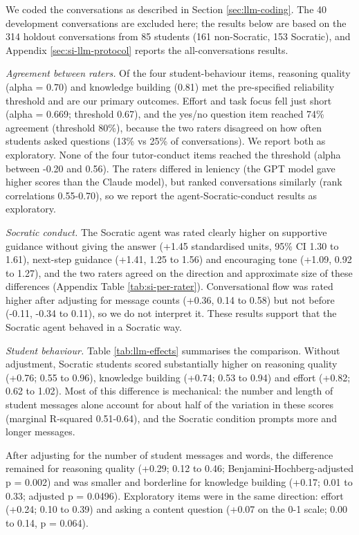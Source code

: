 \documentclass[
  12pt,
]{article}
\begin{document}
We coded the conversations as described in Section \ref{sec:llm-coding}. The 40 development conversations are excluded here; the results below are based on the 314 holdout conversations from 85 students (161 non-Socratic, 153 Socratic), and Appendix \ref{sec:si-llm-protocol} reports the all-conversations results.

\emph{Agreement between raters.} Of the four student-behaviour items, reasoning quality (alpha = 0.70) and knowledge building (0.81) met the pre-specified reliability threshold and are our primary outcomes. Effort and task focus fell just short (alpha = 0.669; threshold 0.67), and the yes/no question item reached 74\% agreement (threshold 80\%), because the two raters disagreed on how often students asked questions (13\% vs 25\% of conversations). We report both as exploratory. None of the four tutor-conduct items reached the threshold (alpha between -0.20 and 0.56). The raters differed in leniency (the GPT model gave higher scores than the Claude model), but ranked conversations similarly (rank correlations 0.55-0.70), so we report the agent-Socratic-conduct results as exploratory.

\emph{Socratic conduct.} The Socratic agent was rated clearly higher on supportive guidance without giving the answer (+1.45 standardised units, 95\% CI 1.30 to 1.61), next-step guidance (+1.41, 1.25 to 1.56) and encouraging tone (+1.09, 0.92 to 1.27), and the two raters agreed on the direction and approximate size of these differences (Appendix Table \ref{tab:si-per-rater}). Conversational flow was rated higher after adjusting for message counts (+0.36, 0.14 to 0.58) but not before (-0.11, -0.34 to 0.11), so we do not interpret it. These results support that the Socratic agent behaved in a Socratic way.

\emph{Student behaviour.} Table \ref{tab:llm-effects} summarises the comparison. Without adjustment, Socratic students scored substantially higher on reasoning quality (+0.76; 0.55 to 0.96), knowledge building (+0.74; 0.53 to 0.94) and effort (+0.82; 0.62 to 1.02). Most of this difference is mechanical: the number and length of student messages alone account for about half of the variation in these scores (marginal R-squared 0.51-0.64), and the Socratic condition prompts more and longer messages.

After adjusting for the number of student messages and words, the difference remained for reasoning quality (+0.29; 0.12 to 0.46; Benjamini-Hochberg-adjusted p = 0.002) and was smaller and borderline for knowledge building (+0.17; 0.01 to 0.33; adjusted p = 0.0496). Exploratory items were in the same direction: effort (+0.24; 0.10 to 0.39) and asking a content question (+0.07 on the 0-1 scale; 0.00 to 0.14, p = 0.064).
\end{document}
